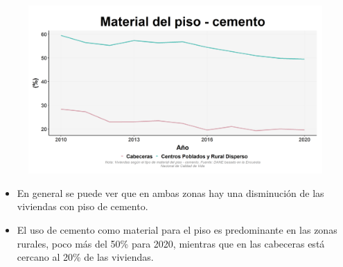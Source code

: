     \begin{figure}[H]
        \caption[Viviendas con piso de cemento por zonas ]{\label{piso_cemento_zonas} }
        \begin{center}
        \includegraphics[width=\textwidth,keepaspectratio]{img/var_178_trend.png}
        \end{center}
    \end{figure}
            \begin{itemize}
                    \item En general se puede ver que en ambas zonas hay una disminución de las viviendas con piso de cemento.
                    \item El uso de cemento como material para el piso es predominante en las zonas rurales, poco más del 50\% para 2020, mientras que en las cabeceras está cercano al 20\% de las viviendas.
                    \end{itemize}


